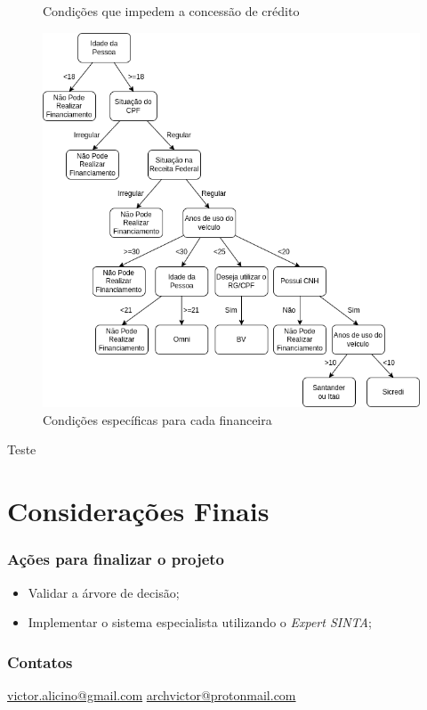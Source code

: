 \documentclass[12pt]{beamer}
\begin{document}
\begin{frame}[allowframebreaks]
\begin{figure}
        \caption{Condições que impedem a concessão de crédito}
    \end{figure}
    \framebreak
    \begin{figure}
        \centering
        \includegraphics[height=.67\textheight]{arvore_completa.png}
        \caption{Condições específicas para cada financeira}
    \end{figure}

    Teste
\end{frame}

\section{Considerações Finais}
\begin{frame}
    \frametitle{Ações para finalizar o projeto}

    \begin{itemize}
        \item Validar a árvore de decisão;
        \item Implementar o sistema especialista utilizando o \textit{Expert SINTA};
    \end{itemize}

\end{frame}

\begin{frame}
    \frametitle{Contatos}
    \centering
    \url{victor.alicino@gmail.com}
    \url{archvictor@protonmail.com}
\end{frame}
\end{document}
